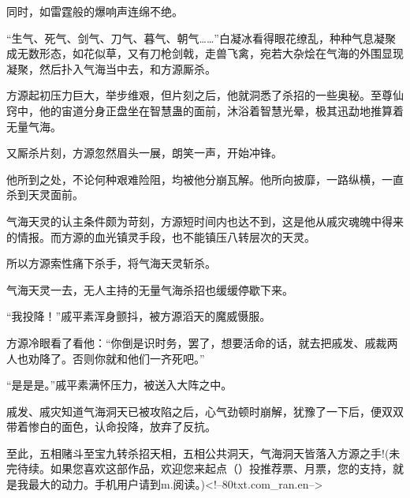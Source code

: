 \begin{this_body}
同时，如雷霆般的爆响声连绵不绝。

“生气、死气、剑气、刀气、暮气、朝气……”白凝冰看得眼花缭乱，种种气息凝聚成无数形态，如花似草，又有刀枪剑戟，走兽飞禽，宛若大杂烩在气海的外围显现凝聚，然后扑入气海当中去，和方源厮杀。

方源起初压力巨大，举步维艰，但片刻之后，他就洞悉了杀招的一些奥秘。至尊仙窍中，他的宙道分身正盘坐在智慧蛊的面前，沐浴着智慧光晕，极其迅勐地推算着无量气海。

又厮杀片刻，方源忽然眉头一展，朗笑一声，开始冲锋。

他所到之处，不论何种艰难险阻，均被他分崩瓦解。他所向披靡，一路纵横，一直杀到天灵面前。

气海天灵的认主条件颇为苛刻，方源短时间内也达不到，这是他从戚灾魂魄中得来的情报。而方源的血光镇灵手段，也不能镇压八转层次的天灵。

所以方源索性痛下杀手，将气海天灵斩杀。

气海天灵一去，无人主持的无量气海杀招也缓缓停歇下来。

“我投降！”戚平素浑身颤抖，被方源滔天的魔威慑服。

方源冷眼看了看他：“你倒是识时务，罢了，想要活命的话，就去把戚发、戚裁两人也劝降了。否则你就和他们一齐死吧。”

“是是是。”戚平素满怀压力，被送入大阵之中。

戚发、戚灾知道气海洞天已被攻陷之后，心气劲顿时崩解，犹豫了一下后，便双双带着惨白的面色，认命投降，放弃了反抗。

至此，五相赌斗至宝九转杀招天相，五相公共洞天，气海洞天皆落入方源之手!(未完待续。如果您喜欢这部作品，欢迎您来起点（）投推荐票、月票，您的支持，就是我最大的动力。手机用户请到m.阅读。)<!--80txt.com\_ran.en-->

\end{this_body}

